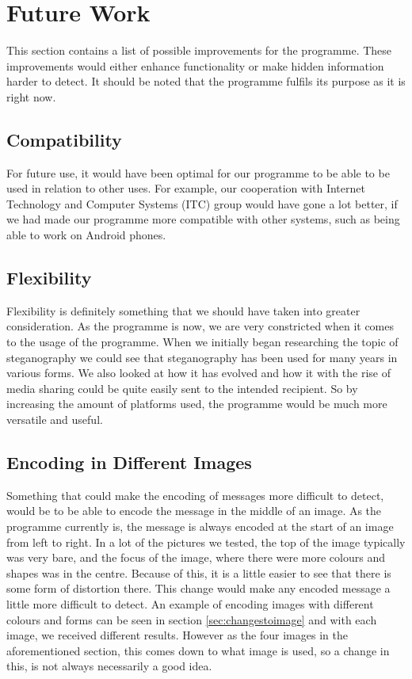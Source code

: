 \section{Future Work}
This section contains a list of possible improvements for the programme.
These improvements would either enhance functionality or make hidden information harder to detect.
It should be noted that the programme fulfils its purpose as it is right now.

\subsection*{Compatibility}
For future use, it would have been optimal for our programme to be able to be used in relation to other uses.
For example, our cooperation with Internet Technology and Computer Systems (ITC) group would have gone a lot better, if we had made our programme more compatible with other systems, such as being able to work on Android phones.

\subsection*{Flexibility}
Flexibility is definitely something that we should have taken into greater consideration.
As the programme is now, we are very constricted when it comes to the usage of the programme.
When we initially began researching the topic of steganography we could see that steganography has been used for many years in various forms.
We also looked at how it has evolved and how it with the rise of media sharing could be quite easily sent to the intended recipient.
So by increasing the amount of platforms used, the programme would be much more versatile and useful.

\subsection*{Encoding in Different Images}
Something that could make the encoding of messages more difficult to detect, would be to be able to encode the message in the middle of an image.
As the programme currently is,  the message is always encoded at the start of an image from left to right.
In a lot of the pictures we tested, the top of the image typically was very bare, and the focus of the image, where there were more colours and shapes was in the centre.
Because of this, it is a little easier to see that there is some form of distortion there.
This change would make any encoded message a little more difficult to detect.
An example of encoding images with different colours and forms can be seen in section \ref{sec:changestoimage} and with each image, we received different results. However as the four images in the aforementioned section, this comes down to what image is used, so a change in this, is not always necessarily a good idea.

